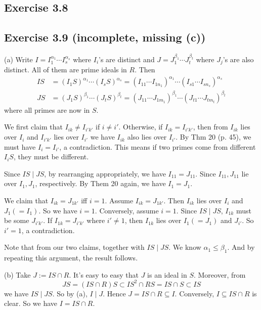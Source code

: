 \documentclass[../Chapter.tex]{subfiles}
\begin{document}
\subsection*{Exercise 3.8}

\subsection*{Exercise 3.9 \color{red}(incomplete, missing (c))}

(a) Write $I=I_1^{\alpha_1}\cdots I_s^{\alpha_s}$ where $I_i$'s are distinct and $J=J_1^{\beta_1}\cdots J_t^{\beta_t}$ where $J_j$'s are also distinct. All of them are prime ideals in $R$. Then
\begin{align*}
IS &= (I_1S)^{\alpha_1}\cdots (I_sS)^{\alpha_s}=(I_{11}\cdots I_{1n_1})^{\alpha_1}\cdots (I_{s1}\cdots I_{sn_s})^{\alpha_s} \\
JS &= (J_1S)^{\beta_1}\cdots (J_tS)^{\beta_t}=(J_{11}\cdots J_{1m_1})^{\beta_1}\cdots (J_{t1}\cdots J_{tm_t})^{\beta_t}
\end{align*}
where all primes are now in $S$.

We first claim that $I_{ik}\neq I_{i'k'}$ if $i\neq i'$. Otherwise, if $I_{ik}=I_{i'k'}$, then from $I_{ik}$ lies over $I_i$ and $I_{i'k'}$ lies over $I_{i'}$ we have $I_{ik}$ also lies over $I_{i'}$. By Thm 20 (p. 45), we must have $I_i=I_{i'}$, a contradiction. This means if two primes come from different $I_iS$, they must be different.

Since $IS\mid JS$, by rearranging appropriately, we have $I_{11}=J_{11}$. Since $I_{11},J_{11}$ lie over $I_1,J_1$, respectively. By Them 20 again, we have $I_1=J_1$.

We claim that $I_{ik}=J_{1k'}$ iff $i=1$. Assume $I_{ik}=J_{1k'}$. Then $I_{ik}$ lies over $I_i$ and $J_1(=I_1)$. So we have $i=1$. Conversely, assume $i=1$. Since $IS\mid JS$, $I_{1k}$ must be some $J_{i'k'}$. If $I_{1k}=J_{i'k'}$ where $i'\neq 1$, then $I_{1k}$ lies over $I_1(=J_1)$ and $J_{i'}$. So $i'=1$, a contradiction.

Note that from our two claims, together with $IS\mid JS$. We know $\alpha_1\leq \beta_1$. And by repeating this argument, the result follows.

(b) Take $J:=IS\cap R$. It's easy to easy that $J$ is an ideal in $S$. Moreover, from $$JS=(IS\cap R)S\subset IS^2\cap RS=IS\cap S\subset IS$$ we have $IS\mid JS$. So by (a), $I\mid J$. Hence $J=IS\cap R\subseteq I$. Conversely, $I\subseteq IS\cap R$ is clear. So we have $I=IS\cap R$.
\end{document}
